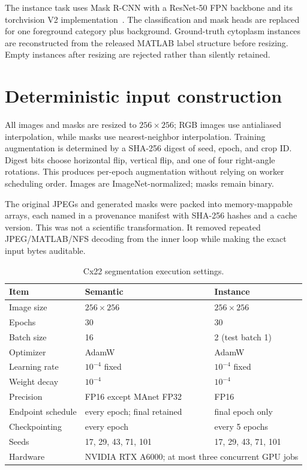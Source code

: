 The instance task uses Mask R-CNN with a ResNet-50 FPN backbone and its torchvision V2 implementation~\cite{he2017maskrcnn}. The classification and mask heads are replaced for one foreground category plus background. Ground-truth cytoplasm instances are reconstructed from the released MATLAB label structure before resizing. Empty instances after resizing are rejected rather than silently retained.

\section{Deterministic input construction}

All images and masks are resized to $256\times256$; RGB images use antialiased interpolation, while masks use nearest-neighbor interpolation. Training augmentation is determined by a SHA-256 digest of seed, epoch, and crop ID. Digest bits choose horizontal flip, vertical flip, and one of four right-angle rotations. This produces per-epoch augmentation without relying on worker scheduling order. Images are ImageNet-normalized; masks remain binary.

The original JPEGs and generated masks were packed into memory-mappable arrays, each named in a provenance manifest with SHA-256 hashes and a cache version. This was not a scientific transformation. It removed repeated JPEG/MATLAB/NFS decoding from the inner loop while making the exact input bytes auditable.

\begin{table}[H]
\centering
\caption{Cx22 segmentation execution settings.}
\label{s1:tab:cx22-hparams}
\begin{tabular}{lll}
\toprule
Item & Semantic & Instance \\
\midrule
Image size & $256\times256$ & $256\times256$ \\
Epochs & 30 & 30 \\
Batch size & 16 & 2 (test batch 1) \\
Optimizer & AdamW & AdamW \\
Learning rate & $10^{-4}$ fixed & $10^{-4}$ fixed \\
Weight decay & $10^{-4}$ & $10^{-4}$ \\
Precision & FP16 except MAnet FP32 & FP16 \\
Endpoint schedule & every epoch; final retained & final epoch only \\
Checkpointing & every epoch & every 5 epochs \\
Seeds & 17, 29, 43, 71, 101 & 17, 29, 43, 71, 101 \\
Hardware & \multicolumn{2}{l}{NVIDIA RTX A6000; at most three concurrent GPU jobs} \\
\bottomrule
\end{tabular}
\end{table}


